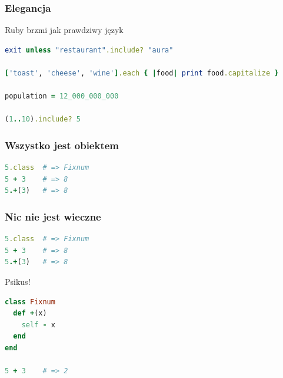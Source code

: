 

\begin{frame}[fragile]
\frametitle{Elegancja}
\begin{block}{Ruby brzmi jak prawdziwy język}
\begin{lstlisting}[language=Ruby,basicstyle=\tiny\ttfamily]
exit unless "restaurant".include? "aura"

['toast', 'cheese', 'wine'].each { |food| print food.capitalize }

population = 12_000_000_000

(1..10).include? 5
\end{lstlisting}
\end{block}
\end{frame}


\begin{frame}[fragile]
\frametitle{Wszystko jest obiektem}
\begin{block}{}
\begin{lstlisting}[language=Ruby]
5.class  # => Fixnum
5 + 3    # => 8
5.+(3)   # => 8
\end{lstlisting}
\end{block}
\end{frame}

\begin{frame}[fragile]
\frametitle{Nic nie jest wieczne}
\begin{block}{}
\begin{lstlisting}[language=Ruby]
5.class  # => Fixnum
5 + 3    # => 8
5.+(3)   # => 8
\end{lstlisting}
\end{block}
\begin{block}{Psikus!}
\begin{lstlisting}[language=Ruby]
class Fixnum
  def +(x)
    self - x
  end
end

5 + 3    # => 2
\end{lstlisting}
\end{block}
\end{frame}

